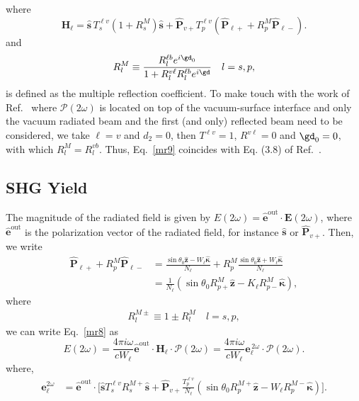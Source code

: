 \documentclass[aps,11pt]{revtex4}
\begin{document}
where
\begin{equation}\label{mr9}
\mathbf{H}_{\ell}
= \hat{\mathbf{s}}\,T_s^{\ell v}
\left(1+
R^M_s
\right)
\hat{\mathbf{s}}
+ \hat{\mathbf{P}}_{v+}T_{p}^{\ell v}
\left(
\hat{\mathbf{P}}_{\ell +} +
R^M_p
 \hat{\mathbf{P}}_{\ell -}
\right). 
\end{equation}
and
\begin{align}\label{m61}
R^M_l\equiv\frac{R^{\ell b}_le^{i\gd_0}}{1+R^{v\ell}_l R^{\ell b}_l e^{i\gd}}
\quad l=s,p
,
\end{align}
is defined as the multiple reflection coefficient.
To make touch with the work of Ref.~ where
$\boldsymbol{\mathcal{P}}(2\omega)$ is located on top of the
vacuum-surface interface and only the vacuum radiated beam and the
first (and only) reflected beam need to be considered, we take
$\ell=v$ and $d_2=0$, then 
$T^{\ell v}=1$, $R^{v\ell}=0$ and $\gd_0=0$, with which
$R^M_l=R^{vb}_l$. 
Thus, Eq.~\eqref{mr9} coincides with Eq. (3.8) of
Ref.~. 

\subsection{SHG Yield}

The magnitude of the radiated field is given by
$E(2\omega)=\hat{\mathbf{e}}^{\mathrm{out}}\cdot\mathbf{E}(2\omega)$, where
$\hat{\mathbf{e}}^{\mathrm{out}}$ is the polarization vector of the radiated
field, for instance $\hat{\mathbf{s}}$ or $\hat{\mathbf{P}}_{v+}$. Then, we
write
\begin{equation}\label{m1}
\begin{split}
\hat{\mathbf{P}}_{\ell +} + R^M_p\hat{\mathbf{P}}_{\ell -}
&= \frac{\sin\theta_0\hat{\mathbf{z}} - W_{\ell}\hat{\boldsymbol{\kappa}}}
        {N_{\ell}}
 + R^M_p
   \frac{\sin\theta_0\hat{\mathbf{z}} + W_{\ell}\hat{\boldsymbol{\kappa}}}
        {N_{\ell}}
\\
&= \frac{1}{N_{\ell}}
\left(
\sin\theta_0R^M_{p+}\hat{\mathbf{z}}
- K_{\ell}R^M_{p-}\hat{\boldsymbol{\kappa}}
\right)
,
\end{split}
\end{equation}
where
\begin{align}\label{rm}
R^{M\pm}_l\equiv 1 \pm R^M_l \quad l=s,p
,
\end{align}
we can write Eq.~\eqref{mr8} as
\begin{equation}\label{r10}
E(2\omega) = \frac{4\pi i \omega}{cW_\ell}
\hat{\mathbf{e}}^{\mathrm{out}}\cdot
\mathbf{H}_{\ell}\cdot
\boldsymbol{\mathcal{P}}(2\omega) 
= \frac{4\pi i \omega}{cW_\ell}
  \mathbf{e}^{\,2\omega}_{\ell}\cdot\boldsymbol{\mathcal{P}}(2\omega). 
\end{equation}
where,
\begin{equation}\label{r12}
\begin{split}
\mathbf{e}^{2\omega}_{\ell} &= \hat{\mathbf{e}}^{\mathrm{out}}\cdot
\Bigg[
\hat{\mathbf{s}}T_{s}^{\ell v}R^{M+}_s\hat{\mathbf{s}} + 
\hat{\mathbf{P}}_{v+}
\frac{T^{\ell v}_{p}}
     {N_\ell}
\left(
\sin\theta_0R^{M+}_p\hat{\mathbf{z}}
- W_{\ell}R^{M-}_p\hat{\boldsymbol{\kappa}}
\right)
\Bigg]
.
\end{split}
\end{equation}  
\end{document}
